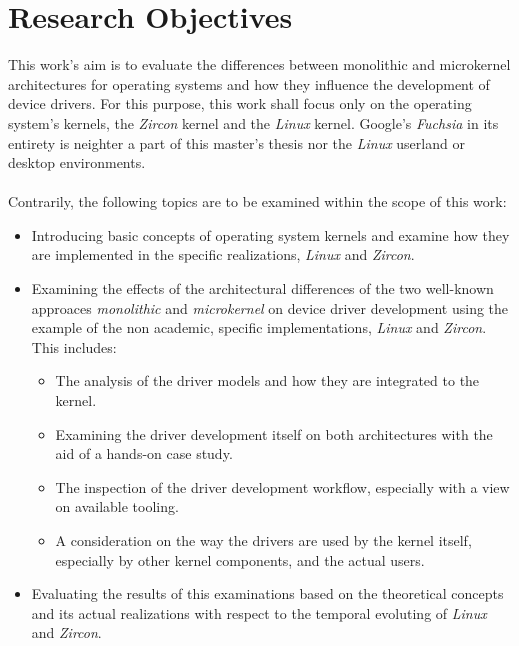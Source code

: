 \section{Research Objectives}\label{sec:research-objectives}
This work's aim is to evaluate the differences between monolithic and microkernel architectures for operating systems and how they influence the development of device drivers.
For this purpose, this work shall focus only on the operating system's kernels, the \textit{Zircon} kernel and the \textit{Linux} kernel.
Google's \textit{Fuchsia} in its entirety is neighter a part of this master's thesis nor the \textit{Linux} userland or desktop environments.\\
\\
Contrarily, the following topics are to be examined within the scope of this work:
\begin{itemize}
    \item Introducing basic concepts of operating system kernels and examine how they are implemented in the specific realizations, \textit{Linux} and \textit{Zircon}.
    \item Examining the effects of the architectural differences of the two well-known approaces \textit{monolithic} and \textit{microkernel} on device driver development using the example of the non academic, specific implementations, \textit{Linux} and \textit{Zircon}. This includes:  
        \begin{itemize}
            \item The analysis of the driver models and how they are integrated to the kernel.
            \item Examining the driver development itself on both architectures with the aid of a hands-on case study.
            \item The inspection of the driver development workflow, especially with a view on available tooling. 
            \item A consideration on the way the drivers are used by the kernel itself, especially by other kernel components, and the actual users.
        \end{itemize}
    \item Evaluating the results of this examinations based on the theoretical concepts and its actual realizations with respect to the temporal evoluting of \textit{Linux} and \textit{Zircon}.
\end{itemize}

